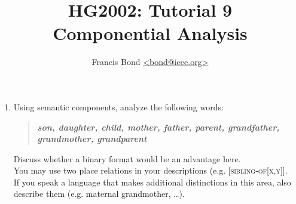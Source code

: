 \documentclass[a4paper]{article}
\title{HG2002: Tutorial 9\\  Componential Analysis}
\author{Francis Bond \url{<bond@ieee.org>}}
\date{}%
\newcommand{\lex}[1]{\textbf{\textit{#1}}}
\newcommand{\cmp}[1]{{[\textsc{#1}]}}
\begin{document}
\maketitle

\begin{enumerate}
\item Using semantic components, analyze the following words:
  \begin{quote}
  \lex{son, daughter, child, mother, father, parent, grandfather,
    grandmother, grandparent}
  \end{quote}
  Discuss whether a binary format would be an advantage here.
  \\ You may use two place relations in your descriptions (e.g. \cmp{sibling-of[x,y]}.
  \\ If you speak a language that makes additional distinctions in this area, also describe them (e.g. maternal grandmother, \ldots).





\end{enumerate}
\end{document}
